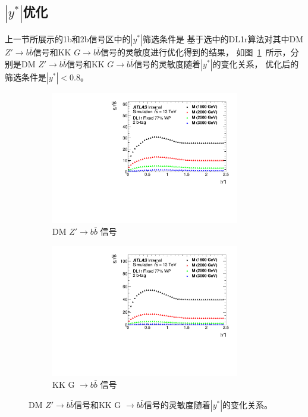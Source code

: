 \subsection{$|y^*|$优化}
\label{sec:DijetBtagging3}

上一节所展示的1b和2b信号区中的$|y^*|$筛选条件是
基于选中的DL1r算法对其中DM $Z\prime\rightarrow b\bar{b}$信号和KK $G \rightarrow b\bar{b}$信号的灵敏度进行优化得到的结果，
如图~\ref{fig:Btag_ystar}~所示，分别是DM $Z\prime\rightarrow b\bar{b}$信号和KK $G \rightarrow b\bar{b}$信号的灵敏度随着$|y^*|$的变化关系，
优化后的筛选条件是$|y^*|<0.8$。

\begin{figure}[!thbp]
  \begin{subfigure}{.5\textwidth}
  \centering
  \includegraphics[width=0.9\textwidth]{figuresDijet/03-BenchmarkSignals/Ystar_DMZ_DL1r_Fixed77.pdf}
  \caption{DM $Z\prime \rightarrow  b\bar{b}$ 信号}
  \end{subfigure}
  \begin{subfigure}{.5\textwidth}
  \centering
  \includegraphics[width=0.9\textwidth]{figuresDijet/03-BenchmarkSignals/Ystar_Gbb_DL1r_Fixed77.pdf}
  \caption{KK G $\rightarrow b\bar{b}$ 信号}
  \end{subfigure}
\caption{
DM $Z\prime\rightarrow b\bar{b}$信号和KK G $\rightarrow b\bar{b}$信号的灵敏度随着$|y^*|$的变化关系。
}
\label{fig:Btag_ystar}
\end{figure}


